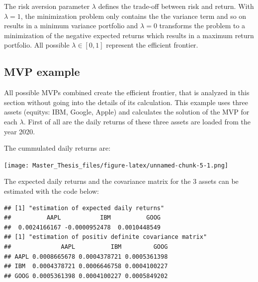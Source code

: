 \documentclass[
  oneside]{book}
\newenvironment{Shaded}{\begin{snugshade}}{\end{snugshade}}
\newcommand{\DecValTok}[1]{\textcolor[rgb]{0.00,0.00,0.81}{#1}}
\newcommand{\FunctionTok}[1]{\textcolor[rgb]{0.00,0.00,0.00}{#1}}
\newcommand{\NormalTok}[1]{#1}
\newcommand{\OtherTok}[1]{\textcolor[rgb]{0.56,0.35,0.01}{#1}}
\newcommand{\SpecialCharTok}[1]{\textcolor[rgb]{0.00,0.00,0.00}{#1}}
\newcommand{\StringTok}[1]{\textcolor[rgb]{0.31,0.60,0.02}{#1}}
\begin{document}
The risk aversion parameter \(\lambda\) defines the trade-off between risk and return. With \(\lambda = 1\), the minimization problem only contains the the variance term and so on results in a minimum variance portfolio and \(\lambda = 0\) transforms the problem to a minimization of the negative expected returns which results in a maximum return portfolio. All possible \(\lambda \in [0, 1]\) represent the efficient frontier.

\hypertarget{mvp-example}{%
\subsection{MVP example}\label{mvp-example}}

All possible MVPs combined create the efficient frontier, that is analyzed in this section without going into the details of its calculation. This example uses three assets (equitys: IBM, Google, Apple) and calculates the solution of the MVP for each \(\lambda\). First of all are the daily returns of these three assets are loaded from the year 2020.

The cummulated daily returns are:

\texttt{[image: Master\_Thesis\_files/figure-latex/unnamed-chunk-5-1.png]}

The expected daily returns and the covariance matrix for the 3 assets can be estimated with the code below:

\begin{Shaded}
\end{Shaded}

\begin{verbatim}
## [1] "estimation of expected daily returns"
##          AAPL           IBM          GOOG 
##  0.0024166167 -0.0000952478  0.0010448549 
## [1] "estimation of positiv definite covariance matrix"
##              AAPL          IBM         GOOG
## AAPL 0.0008665678 0.0004378721 0.0005361398
## IBM  0.0004378721 0.0006646758 0.0004100227
## GOOG 0.0005361398 0.0004100227 0.0005849202
\end{verbatim}
\end{document}

